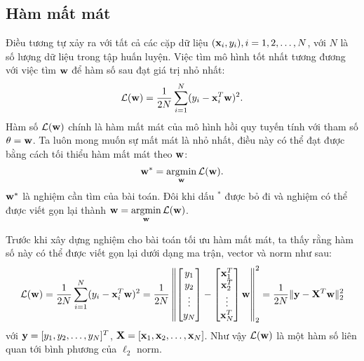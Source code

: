 \subsection{Hàm mất mát}

Điều tương tự xảy ra với tất cả các cặp dữ liệu $(\mathbf{x}_i, y_i), i = 1, 2, \dots,
N $, với $N$ là số lượng dữ liệu trong tập huấn luyện. Việc tìm mô hình tốt nhất tương đương với việc tìm $\mathbf{w}$ để hàm số sau
đạt giá trị nhỏ nhất:
\begin{equation}
\label{eqn:3_2}
\mathcal{L}(\mathbf{w}) = \frac{1}{2N}\sum_{i=1}^N (y_i - \mathbf{x}_i^T\mathbf{w})^2.
\end{equation}
Hàm số $\mathcal{L}(\mathbf{w})$ chính là hàm mất mát của mô hình hồi quy tuyến tính với tham số $\theta = \mathbf{w}$. Ta luôn mong muốn sự
mất mát là nhỏ nhất, điều này có thể
đạt được bằng cách tối thiểu hàm mất mát theo $\mathbf{w}$:
\begin{equation}
\label{eqn:3_4}
\mathbf{w}^* = \operatorname*{argmin}_{\mathbf{w}} \mathcal{L}(\mathbf{w}).
\end{equation}
$\mathbf{w}^*$ là nghiệm cần tìm của bài toán. Đôi khi dấu $^*$ được bỏ đi và nghiệm có thể được viết gọn lại thành $\displaystyle \mathbf{w} = \operatorname*{argmin}_{\mathbf{w}}\mathcal{L}(\mathbf{w})$.




Trước khi xây dựng nghiệm cho bài toán tối ưu hàm mất mát, ta thấy rằng hàm
số này có thể được viết gọn lại dưới dạng ma trận, vector và norm như sau:
\begin{equation}
\mathcal{L}(\mathbf{w}) = \frac{1}{2N}\sum_{i=1}^N (y_i - \mathbf{x}_i^T\mathbf{w})^2
= \frac{1}{2N} \left\|\left[\begin{matrix} y_1 \\y_2 \\\vdots \\ y_N  \end{matrix}\right] -
\left[\begin{matrix} \mathbf{x}_1^T \\ \mathbf{x}_2^T \\ \vdots \\ \mathbf{x}_N^T \end{matrix}\right] \mathbf{w}
\right\|_2^2 = \frac{1}{2N} \| \mathbf{y} - \mathbf{X}^T\mathbf{w}\|_2^2
\end{equation}
với $\mathbf{y} = [y_1, y_2, \dots, y_N]^T$, $\mathbf{X} = [\mathbf{x}_1, \mathbf{x}_2, \dots, \mathbf{x}_N]$.
Như vậy $\mathcal{L}(\mathbf{w})$ là một hàm số liên quan tới bình phương của $\ell_2$ norm.







